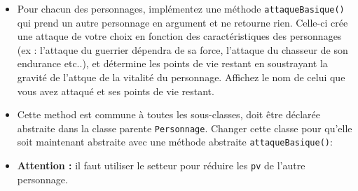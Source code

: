 \begin{Exercice}[15 minutes]
\begin{itemize}
    

    \item Pour chacun des personnages, implémentez une méthode \lstinline{attaqueBasique()} qui prend un autre personnage en argument et ne retourne rien. Celle-ci crée une attaque de votre choix en fonction des caractéristiques des personnages (ex : l’attaque du guerrier dépendra de sa force, l’attaque du chasseur de son endurance etc..), et détermine les points de vie restant en soustrayant la gravité de l'attque de la vitalité du personnage. Affichez le nom de celui que vous avez attaqué et ses points de vie restant.
    \item Cette method est commune à toutes les sous-classes, doit être déclarée abstraite dans la classe parente \lstinline{Personnage}. Changer cette classe pour qu'elle soit maintenant abstraite avec une méthode abstraite \lstinline{attaqueBasique()}:
    \item \textbf{Attention :} il faut utiliser le setteur pour réduire les \lstinline{pv} de l’autre personnage.
    
    
\end{itemize}

\begin{solution}
    
\end{solution}
\begin{solution}
    
\end{solution}

\begin{solution}
    
\end{solution}
\begin{solution}
    
\end{solution}
\end{Exercice}

